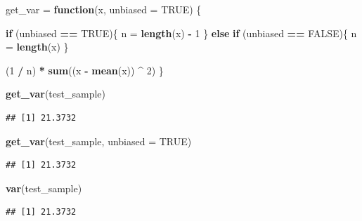 \documentclass[]{book}
\newenvironment{Shaded}{\begin{snugshade}}{\end{snugshade}}
\newcommand{\KeywordTok}[1]{\textcolor[rgb]{0.13,0.29,0.53}{\textbf{#1}}}
\newcommand{\DataTypeTok}[1]{\textcolor[rgb]{0.13,0.29,0.53}{#1}}
\newcommand{\DecValTok}[1]{\textcolor[rgb]{0.00,0.00,0.81}{#1}}
\newcommand{\StringTok}[1]{\textcolor[rgb]{0.31,0.60,0.02}{#1}}
\newcommand{\OtherTok}[1]{\textcolor[rgb]{0.56,0.35,0.01}{#1}}
\newcommand{\ControlFlowTok}[1]{\textcolor[rgb]{0.13,0.29,0.53}{\textbf{#1}}}
\newcommand{\OperatorTok}[1]{\textcolor[rgb]{0.81,0.36,0.00}{\textbf{#1}}}
\newcommand{\NormalTok}[1]{#1}
\begin{document}
\begin{Shaded}
\begin{Highlighting}[]
\NormalTok{get_var =}\StringTok{ }\ControlFlowTok{function}\NormalTok{(x, }\DataTypeTok{unbiased =} \OtherTok{TRUE}\NormalTok{) \{}

  \ControlFlowTok{if}\NormalTok{ (unbiased }\OperatorTok{==}\StringTok{ }\OtherTok{TRUE}\NormalTok{)\{}
\NormalTok{    n =}\StringTok{ }\KeywordTok{length}\NormalTok{(x) }\OperatorTok{-}\StringTok{ }\DecValTok{1}
\NormalTok{  \} }\ControlFlowTok{else} \ControlFlowTok{if}\NormalTok{ (unbiased }\OperatorTok{==}\StringTok{ }\OtherTok{FALSE}\NormalTok{)\{}
\NormalTok{    n =}\StringTok{ }\KeywordTok{length}\NormalTok{(x) }
\NormalTok{   \}}

\NormalTok{  (}\DecValTok{1} \OperatorTok{/}\StringTok{ }\NormalTok{n) }\OperatorTok{*}\StringTok{ }\KeywordTok{sum}\NormalTok{((x }\OperatorTok{-}\StringTok{ }\KeywordTok{mean}\NormalTok{(x)) }\OperatorTok{^}\StringTok{ }\DecValTok{2}\NormalTok{)}
\NormalTok{\}}
\end{Highlighting}
\end{Shaded}

\begin{Shaded}
\begin{Highlighting}[]
\KeywordTok{get_var}\NormalTok{(test_sample)}
\end{Highlighting}
\end{Shaded}

\begin{verbatim}
## [1] 21.3732
\end{verbatim}

\begin{Shaded}
\begin{Highlighting}[]
\KeywordTok{get_var}\NormalTok{(test_sample, }\DataTypeTok{unbiased =} \OtherTok{TRUE}\NormalTok{)}
\end{Highlighting}
\end{Shaded}

\begin{verbatim}
## [1] 21.3732
\end{verbatim}

\begin{Shaded}
\begin{Highlighting}[]
\KeywordTok{var}\NormalTok{(test_sample)}
\end{Highlighting}
\end{Shaded}

\begin{verbatim}
## [1] 21.3732
\end{verbatim}
\end{document}
